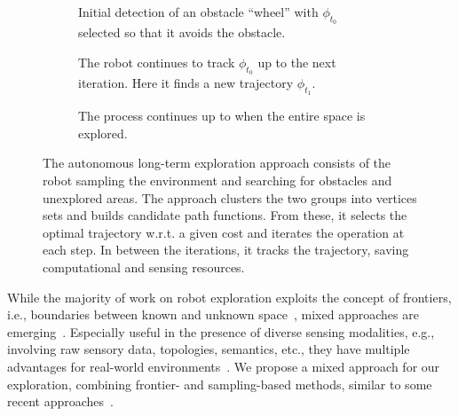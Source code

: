\documentclass[lettersize,journal,twoside]{IEEEtran}
\theoremstyle{definition}
\begin{document}
\begin{figure*}
  \begin{subfigure}[m]{0.33\textwidth}
    \centering
    
    \caption{Initial detection of an obstacle ``wheel'' with $\phi_{t_0}$ selected so that it avoids the obstacle.}
    \label{fig:3-1}
  \end{subfigure}
  \hfill
  \begin{subfigure}[m]{0.32\textwidth}
    \centering
    \hspace*{-.15cm}
    
    \caption{The robot continues to track $\phi_{t_0}$ up to the next iteration. Here it finds a new trajectory $\phi_{t_1}$.}
    \label{fig:3-2}
  \end{subfigure}
  \begin{subfigure}[m]{0.33\textwidth}
    \centering
    \hspace*{.05cm}
    
    \caption{The process continues up to when the entire space is explored.}
    \label{fig:3-3}
  \end{subfigure}
  \caption{The autonomous long-term %
  exploration %
  approach consists of the robot sampling the environment and searching for obstacles and unexplored areas. The %
  approach clusters the two groups into vertices sets and builds candidate path functions. From these, it selects the optimal trajectory w.r.t. a given cost and iterates the operation at each step. In between the iterations, it tracks the trajectory, saving computational and sensing resources.}
  \label{fig:3}
\end{figure*}
\noindent
While the majority 
of work on robot exploration 
exploits the concept of frontiers, %
i.e., boundaries between known and unknown space~\cite{%
placed2022survey,dang2019graph}, mixed approaches are emerging~\cite{dai2020fast,schmid2020efficient,placed2022survey}. 
Especially useful in the presence of diverse sensing modalities, e.g., involving raw sensory data, topologies, semantics, etc., they have multiple %
advantages for real-world environments~\cite{placed2022survey,batinovic2021multi}. 
%
We propose a %
mixed approach for our %
exploration, %
combining frontier- and sampling-based methods, similar to some recent approaches~\cite{dai2020fast,%
shrestha2019learned}. %
\end{document}
